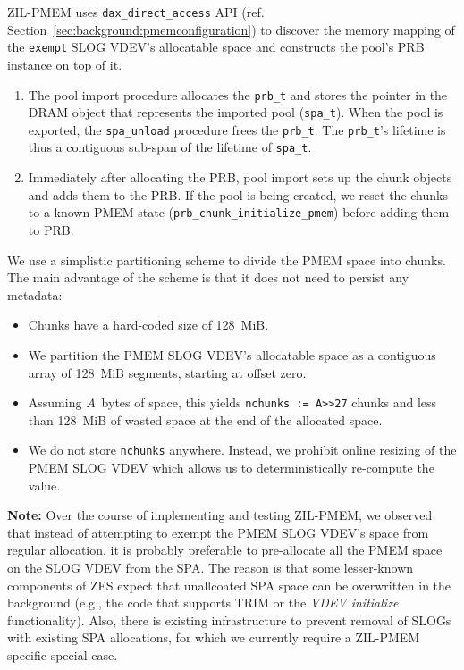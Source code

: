 \documentclass[12pt,a4paper,twoside]{book}
\begin{document}
ZIL-PMEM uses \lstinline{dax_direct_access} API (ref. Section~\ref{sec:background:pmemconfiguration}) to discover the memory mapping of the \lstinline{exempt} SLOG VDEV's allocatable space and constructs the pool's PRB instance on top of it.
\begin{enumerate}
\item The pool import procedure allocates the \lstinline{prb_t} and stores the pointer in the DRAM object that represents the imported pool (\lstinline{spa_t}).
When the pool is exported, the \lstinline{spa_unload} procedure frees the \lstinline{prb_t}.
The \lstinline{prb_t}'s lifetime is thus a contiguous sub-span of the lifetime of \lstinline{spa_t}.
\item  Immediately after allocating the PRB, pool import sets up the chunk objects and adds them to the PRB.
If the pool is being created, we reset the chunks to a known PMEM state (\lstinline{prb_chunk_initialize_pmem}) before adding them to PRB.
\end{enumerate}

We use a simplistic partitioning scheme to divide the PMEM space into chunks.
The main advantage of the scheme is that it does not need to persist any metadata:
\begin{itemize}[noitemsep]
    \item Chunks have a hard-coded size of 128~MiB.
    \item We partition the PMEM SLOG VDEV's allocatable space as a contiguous array of 128~MiB segments, starting at offset zero.
    \item Assuming $A$~bytes of space, this yields \lstinline{nchunks := A>>27} chunks and less than 128~MiB of wasted space at the end of the allocated space.
    \item We do not store \lstinline{nchunks} anywhere. Instead, we prohibit online resizing of the PMEM SLOG VDEV which allows us to deterministically re-compute the value.
\end{itemize}

\textbf{Note:} Over the course of implementing and testing ZIL-PMEM, we observed that instead of attempting to exempt the PMEM SLOG VDEV's space from regular allocation, it is probably preferable to pre-allocate all the PMEM space on the SLOG VDEV from the SPA.
The reason is that some lesser-known components of ZFS expect that unallcoated SPA space can be overwritten in the background (e.g., the code that supports TRIM or the \textit{VDEV initialize} functionality).
Also, there is existing infrastructure to prevent removal of SLOGs with existing SPA allocations, for which we currently require a ZIL-PMEM specific special case.
\end{document}
